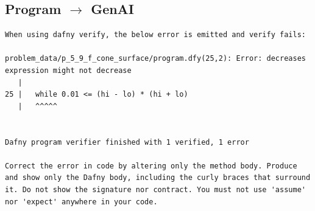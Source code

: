 \documentclass{article}
\begin{document}
\subsection*{Program $\rightarrow$ GenAI}
\begin{lstlisting}
When using dafny verify, the below error is emitted and verify fails:

problem_data/p_5_9_f_cone_surface/program.dfy(25,2): Error: decreases expression might not decrease
   |
25 |   while 0.01 <= (hi - lo) * (hi + lo)
   |   ^^^^^


Dafny program verifier finished with 1 verified, 1 error

Correct the error in code by altering only the method body. Produce and show only the Dafny body, including the curly braces that surround it. Do not show the signature nor contract. You must not use 'assume' nor 'expect' anywhere in your code.
\end{lstlisting}
\end{document}
